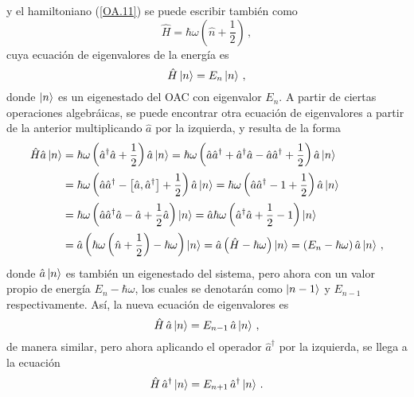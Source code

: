 y el hamiltoniano (\ref{OA.11}) se puede escribir también como
\begin{equation}
  \label{OA.13}
  \hat{H} = \hbar \omega \left(\hat{n} + \frac{1}{2}\right)\,,
\end{equation}
cuya ecuación de eigenvalores de la energía es
\begin{equation}
  \label{OA.14}
  \hat{H} \ket{n} = E_n\ket{n} \,,
\end{equation}
donde $\ket{n}$ es un eigenestado del OAC con eigenvalor $E_n$. A partir de ciertas operaciones algebráicas, se puede encontrar otra ecuación de eigenvalores a partir de la anterior multiplicando $\hat{a}$ por la izquierda, y resulta de la forma
\begin{align}
  \hat{H} \hat{a}\ket{n} & = \hbar\omega\left(\hat{a}^{\dagger}\hat{a}+\frac{1}{2}\right)\hat{a}\ket{n} = \hbar\omega\left(\hat{a}\hat{a}^{\dagger}+\hat{a}^{\dagger}\hat{a}-\hat{a}\hat{a}^{\dagger}+\frac{1}{2}\right)\hat{a}\ket{n} \nonumber \\
                         & = \hbar\omega\left(\hat{a}\hat{a}^{\dagger}-\left[\hat{a},\hat{a}^{\dagger}\right]+\frac{1}{2}\right)\hat{a}\ket{n} = \hbar\omega\left(\hat{a}\hat{a}^{\dagger}-1+\frac{1}{2}\right)\hat{a}\ket{n}          \nonumber \\
                         & = \hbar\omega\left(\hat{a}\hat{a}^{\dagger}\hat{a}-\hat{a}+\frac{1}{2}\hat{a}\right)\ket{n} = \hat{a}\hbar\omega\left(\hat{a}^{\dagger}\hat{a}+\frac{1}{2}-1\right)\ket{n}                                  \nonumber \\
                         & = \hat{a}\left(\hbar\omega\left(\hat{n}+\frac{1}{2}\right)-\hbar\omega\right)\ket{n} = \hat{a}\left(\hat{H}-\hbar\omega\right)\ket{n} = \left(E_{n}-\hbar\omega\right)\hat{a}\ket{n}\,,
\end{align}
donde $\hat{a}\ket{n}$ es también un eigenestado del sistema, pero ahora con un valor propio de energía $E_n - \hbar\omega$, los cuales se denotarán como $\ket{n-1}$ y $E_{n-1}$ respectivamente. Así, la nueva ecuación de eigenvalores es
\begin{equation}
  \label{OA.15}
  \hat{H}\, \hat{a}\ket{n} = E_{n-1}\, \hat{a}\ket{n}\,,
\end{equation} %
de manera similar, pero ahora aplicando el operador $\hat{a}^{\dagger}$ por la izquierda, se llega a la ecuación
\begin{equation}
  \label{OA.16}
  \hat{H} \,\hat{a}^{\dagger}\ket{n} = E_{n+1}\, \hat{a}^{\dagger}\ket{n}\,.
\end{equation}
